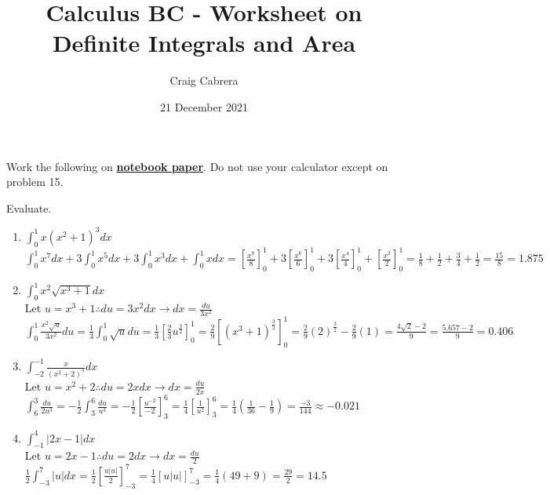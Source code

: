\documentclass[10pt, letterpaper]{report}
\title{Calculus BC - Worksheet on Definite Integrals and Area}
\author{Craig Cabrera}
\date{21 December 2021}
\begin{document}
\maketitle
Work the following on \textbf{\underline{notebook paper}}. Do not use your calculator except on problem 15.
\par Evaluate.
\begin{enumerate}
  \item{$\int_{0}^{1}x(x^2+1)^3dx$} \\

    $\int_{0}^{1}x^7dx+3\int_{0}^{1}x^5dx+3\int_{0}^{1}x^3dx+\int_{0}^{1}xdx=
    [\frac{x^8}{8}]_{0}^{1}+3[\frac{x^6}{6}]_{0}^{1}+3[\frac{x^4}{4}]_{0}^{1}+[\frac{x^2}{2}]_{0}^{1}=
    \frac{1}{8}+\frac{1}{2}+\frac{3}{4}+\frac{1}{2}=\frac{15}{8}=1.875$ \\

  \item{$\int_{0}^{1}x^2\sqrt{x^3+1}dx$} \\

    Let $u=x^3+1 \therefore du=3x^2dx \rightarrow dx=\frac{du}{3x^2}$ \\

    $\int_{0}^{1}\frac{x^2\sqrt{u}}{3x^2}du=
    \frac{1}{3}\int_{0}^1\sqrt{u}du=
    \frac{1}{3}[\frac{2}{3}u^{\frac{3}{2}}]_{0}^{1}=
    \frac{2}{9}[(x^3+1)^\frac{3}{2}]_{0}^{1}=
    \frac{2}{9}(2)^{\frac{3}{2}}-\frac{2}{9}(1)=
    \frac{4\sqrt{2}-2}{9}=
    \frac{5.657-2}{9}=0.406$ \\

  \item{$\int_{-2}^{-1}\frac{x}{(x^2+2)^3}dx$} \\

    Let $u=x^2+2\therefore du=2xdx\rightarrow dx=\frac{du}{2x}$ \\

    $\int_{6}^{3}\frac{du}{2u^3}=
    -\frac{1}{2}\int_{3}^{6}\frac{du}{u^3}=
    -\frac{1}{2}[\frac{u^{-2}}{-2}]_{3}^{6}=
    \frac{1}{4}[\frac{1}{u^2}]_{3}^{6}=
    \frac{1}{4}(\frac{1}{36}-\frac{1}{9})=
    \frac{-3}{144}\approx -0.021$ \\

  \item{$\int_{-1}^{4}|2x-1|dx$} \\

    Let $u=2x-1\therefore du=2dx\rightarrow dx=\frac{du}{2}$ \\

    $\frac{1}{2}\int_{-3}^{7}|u|dx=
    \frac{1}{2}[\frac{u|u|}{2}]_{-3}^{7}=
    \frac{1}{4}[u|u|]_{-3}^{7}=
    \frac{1}{4}(49+9)=\frac{29}{2}=14.5$ \\


\end{enumerate}
\end{document}
